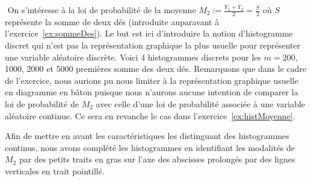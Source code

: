 \documentclass[10pt]{report}
\begin{document}
\begin{exercice}
\begin{enumerate}
\end{enumerate}
\end{exercice}
\begin{exercice} ${ }$\label{ex:histMoyDes}
On s'intéresse à la loi de probabilité de la moyenne $M_2:=\frac{Y_1+Y_2}2=\frac{S}2$ où $S$ représente la somme de deux dés (introduite auparavant à l'exercice~\ref{ex:sommeDes}). Le but est ici d'introduire la notion d'histogramme discret qui n'est pas la représentation graphique la plus usuelle pour représenter une variable aléatoire discrète. Voici 4 histogrammes discrets pour les $m=200$, 1000, 2000 et 5000 premières somme des deux dés. Remarquons que dans le cadre de l'exercice, nous aurions pu nous limiter à la représentation graphique usuelle en diagramme en bâton
puisque nous n'aurons aucune intention de comparer la loi de probabilité de $M_2$ avec celle d'une loi de probabilité associée à une variable aléatoire continue. Ce sera en revanche le cas dans l'exercice~\ref{ex:histMoyenne}.
    








Afin de mettre en avant les caractéristiques les distinguant des histogrammes continus, nous avons complété les histogrammes en identifiant les modalités de $M_2$ par des petits traits en gras sur l'axe des abscisses prolongés par des lignes verticales en trait pointillé.


\end{exercice}
\end{document}
